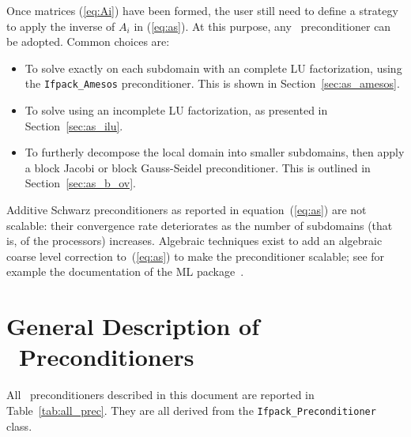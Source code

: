 {\smallskip

Once matrices (\ref{eq:Ai}) have been formed, the user still need to define a
strategy to apply the inverse of $A_i$ in (\ref{eq:as}). At this purpose,
any \ifpack\ preconditioner can be adopted. Common choices are:
\begin{itemize}
\item To solve exactly on each subdomain with an complete LU factorization, using the \verb!Ifpack_Amesos!
preconditioner. This is shown in Section~\ref{sec:as_amesos}.
\item To solve using an incomplete LU factorization, as presented in
Section~\ref{sec:as_ilu}.
\item To furtherly decompose the local domain into smaller subdomains,
  then apply a block Jacobi or block Gauss-Seidel preconditioner. This is
  outlined in Section~\ref{sec:as_b_ov}.
\end{itemize}

\begin{remark}
Additive Schwarz preconditioners as reported in equation~(\ref{eq:as}) 
are not scalable: their convergence rate
deteriorates as the number of subdomains (that is, of the processors)
increases. Algebraic techniques
exist to add an algebraic coarse level correction to~(\ref{eq:as}) to make the
preconditioner scalable; 
see for example the documentation of the ML
package~\cite{ml-guide}.
\end{remark}

\section{General Description of \ifpack\ Preconditioners}
\label{sec:prec}

All \ifpack\ preconditioners described in this document
are reported in Table~\ref{tab:all_prec}. They are all derived from the 
\verb!Ifpack_Preconditioner!
class.


}
